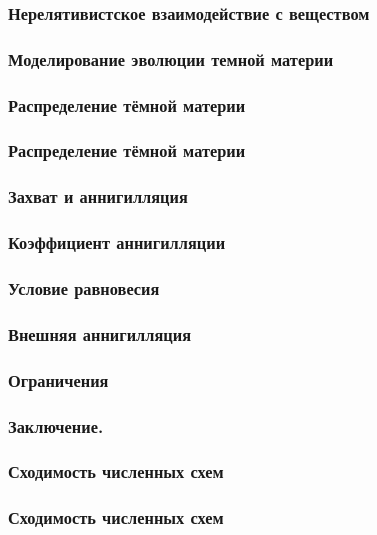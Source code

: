 	\begin{frame}
		\frametitle{Нерелятивистское взаимодействие с веществом}
		
	\end{frame}
	
	\begin{frame}
		\frametitle{Моделирование эволюции темной материи}
		
	\end{frame}
	
	\begin{frame}
		\frametitle{Распределение тёмной материи}
		
	\end{frame}
	
	

	
	\begin{frame}
		\frametitle{Распределение тёмной материи}
		
	\end{frame}
	\begin{frame}
		\frametitle{Захват и аннигилляция}
		
	\end{frame}
	
	
	\begin{frame}
		\frametitle{Коэффициент аннигилляции}
		
	\end{frame}
	
	
	\begin{frame}
		\frametitle{Условие равновесия}
		
	\end{frame}
	
	\begin{frame}
		\frametitle{Внешняя аннигилляция}
		
	\end{frame}
	
	\begin{frame}
		\frametitle{Ограничения}
		
	\end{frame}
	
	\begin{frame}
		\frametitle{Заключение.}
		
	\end{frame}
	\begin{frame}
		
	\end{frame}
	
	\begin{frame}
		\frametitle{Сходимость численных схем}
		
	\end{frame}
	\begin{frame}
		\frametitle{Сходимость численных схем}
		
	\end{frame}
 

